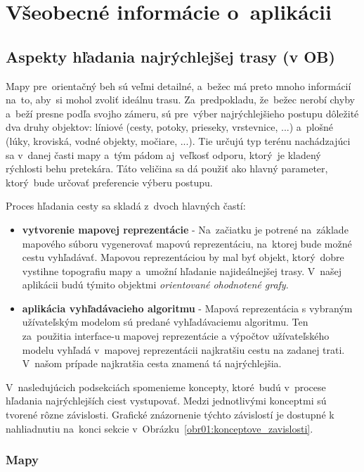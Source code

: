 \chapter{Všeobecné informácie o~aplikácii}

\section{Aspekty hľadania najrýchlejšej trasy (v OB)}\label{Aspekty_hladania}

Mapy pre~orientačný beh sú veľmi detailné, a~bežec má preto mnoho informácií na~to, aby~si mohol zvoliť ideálnu trasu. Za~predpokladu, že~bežec nerobí chyby a~beží presne podľa svojho zámeru, sú pre~výber najrýchlejšieho postupu dôležité dva druhy objektov: líniové (cesty, potoky, prieseky, vrstevnice, ...) a~plošné (lúky, kroviská, vodné objekty, močiare, ...). Tie určujú typ terénu nachádzajúci sa v~danej časti mapy a~tým pádom aj~veľkosť odporu, ktorý~je kladený rýchlosti behu pretekára. Táto veličina sa dá použiť ako hlavný parameter, ktorý~bude určovať preferencie výberu postupu.

Proces hľadania cesty sa skladá z~dvoch hlavných častí: 
\begin{itemize}
    \item \textbf{vytvorenie mapovej reprezentácie} - Na~začiatku je potrené na~základe mapového súboru vygenerovať mapovú reprezentáciu, na~ktorej bude možné cestu vyhľadávať. Mapovou reprezentáciou by mal byť objekt, ktorý~dobre vystihne topografiu mapy a~umožní hľadanie najideálnejšej trasy. V~našej aplikácii budú týmito objektmi \textit{orientované ohodnotené grafy}.  
    \item \textbf{aplikácia vyhľadávacieho algoritmu} - Mapová reprezentácia s vybraným užívateľským modelom sú predané vyhľadávaciemu algoritmu. Ten za~použitia interface-u mapovej reprezentácie a výpočtov užívateľského modelu vyhľadá v~mapovej reprezentácii najkratšiu cestu na zadanej trati. V~našom prípade najkratšia cesta znamená tá najrýchlejšia.
\end{itemize}

V~nasledujúcich podsekciách spomenieme koncepty, ktoré~budú v~procese hľadania najrýchlejších ciest vystupovať. Medzi jednotlivými konceptmi sú tvorené rôzne závislosti. Grafické znázornenie týchto závislostí je dostupné k nahliadnutiu na~konci sekcie v~Obrázku~\ref{obr01:konceptove_zavislosti}.   

\subsection{Mapy}\label{mapy}

